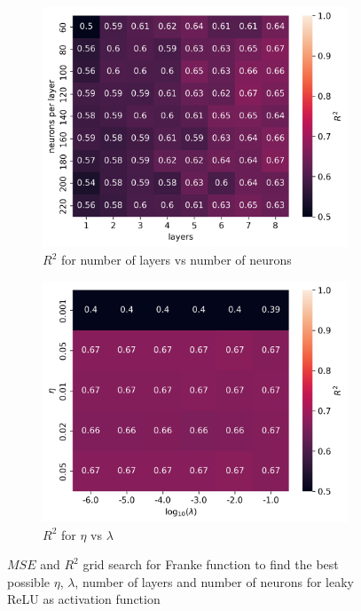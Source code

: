 \documentclass[11pt]{article}
\begin{document}
\begin{figure}[H]
\begin{subfigure}{.5\textwidth}
    \centering
    \includegraphics[width=\textwidth]{../figures/franke_L_n_test_lrelu_R2.png}
    \caption{$R^2$ for number of layers vs number of neurons}
    \label{fig:}
  \end{subfigure}
  \begin{subfigure}{.5\textwidth}
    \centering
    \includegraphics[width=\textwidth]{../figures/franke_eta_lmb_lrelu_R2.png}
    \caption{$R^2$ for $\eta$ vs $\lambda$}
    \label{fig:}
  \end{subfigure}
  \caption{$MSE$ and $R^2$ grid search for Franke function to find the best possible $\eta$, $\lambda$, number of layers and number of neurons for leaky ReLU as activation function}
  \label{fig:franke_grid_3}
\end{figure}
\end{document}
